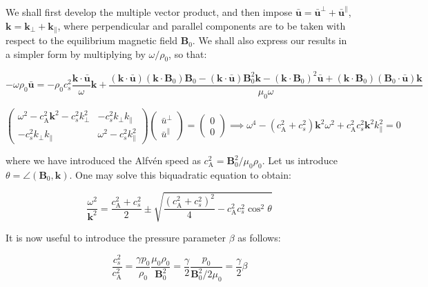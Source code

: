 We shall first develop the multiple vector product, and then impose $\bar{\mathbf{u}}=\bar{\mathbf{u}}^\perp+\bar{\mathbf{u}}^\parallel$, $\mathbf{k}=\mathbf{k}_\perp+\mathbf{k}_\parallel$, where perpendicular and parallel components are to be taken with respect to the equilibrium magnetic field $\mathbf{B}_0$. We shall also express our results in a simpler form by multiplying by $\omega/\rho_0$, so that:

\begin{equation}
    \label{eq-4-19}
    -\omega\rho_0\bar{\mathbf{u}}=-\rho_0c_s^2\frac{\mathbf{k}\cdot\bar{\mathbf{u}}}{\omega}\mathbf{k}+\frac{(\mathbf{k}\cdot\bar{\mathbf{u}})(\mathbf{k}\cdot\mathbf{B}_0)\mathbf{B}_0-(\mathbf{k}\cdot\bar{\mathbf{u}})\mathbf{B}_0^2\mathbf{k}-(\mathbf{k}\cdot\mathbf{B}_0)^2\bar{\mathbf{u}}+(\mathbf{k}\cdot\mathbf{B}_0)(\mathbf{B}_0\cdot\bar{\mathbf{u}})\mathbf{k}}{\mu_0\omega}
\end{equation}

\begin{equation}
    \begin{pmatrix}
        \omega^2-c_\text{A}^2\mathbf{k}^2-c_s^2k_\perp^2&-c_s^2k_\perp k_\parallel\\
        -c_s^2k_\perp k_\parallel & \omega^2-c_s^2k_\parallel^2
    \end{pmatrix}\begin{pmatrix}
        \bar{u}^\perp\\
        \bar{u}^\parallel
    \end{pmatrix}=\begin{pmatrix}
        0\\0
    \end{pmatrix}\implies \omega^4-(c_\text{A}^2+c_s^2)\mathbf{k}^2\omega^2+c_\text{A}^2c_s^2\mathbf{k}^2k_\parallel^2=0
\end{equation}

where we have introduced the Alfvén speed as $c_\text{A}^2=\mathbf{B}_0^2/\mu_0\rho_0$. Let us introduce $\theta=\angle(\mathbf{B}_0,\mathbf{k})$. One may solve this biquadratic equation to obtain:

\begin{equation}
    \frac{\omega^2}{\mathbf{k}^2}=\frac{c_\text{A}^2+c_s^2}{2}\pm\sqrt{\frac{(c_\text{A}^2+c_s^2)^2}{4}-c_\text{A}^2c_s^2\cos^2{\theta}}
\end{equation}

It is now useful to introduce the pressure parameter $\beta$ as follows:

\begin{equation}
    \frac{c_s^2}{c_\text{A}^2}=\frac{\gamma p_0}{\rho_0}\frac{\mu_0\rho_0}{\mathbf{B}_0^2}=\frac{\gamma}{2}\frac{p_0}{\mathbf{B}_0^2/2\mu_0}=\frac{\gamma}{2}\beta
\end{equation}


